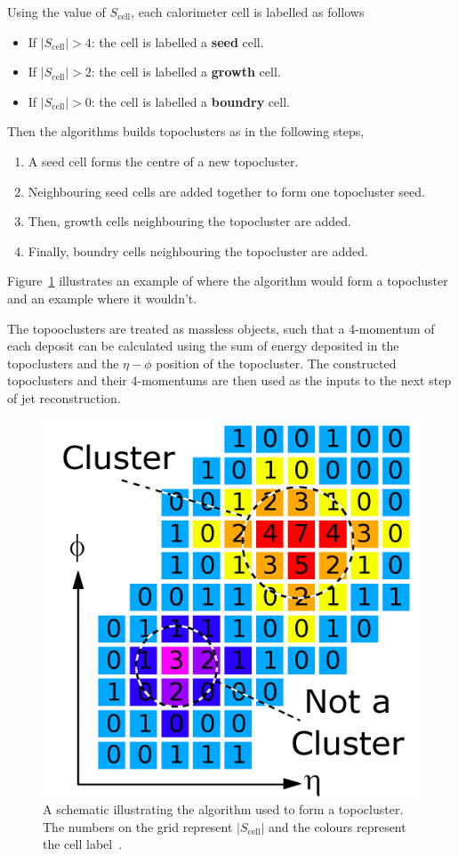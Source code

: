 \noindent
Using the value of $S_{\text{cell}}$, each calorimeter cell is labelled as follows
\begin{itemize}
\item If $|S_{\text{cell}}| > 4$: the cell is labelled a \textbf{seed} cell.
\item If $|S_{\text{cell}}| > 2$: the cell is labelled a \textbf{growth} cell.
\item If $|S_{\text{cell}}| > 0$: the cell is labelled a \textbf{boundry} cell.
\end{itemize}
Then the algorithms builds topoclusters as in the following steps,
\begin{enumerate}
\item A seed cell forms the centre of a new topocluster.
\item Neighbouring seed cells are added together to form one topocluster seed.
\item Then, growth cells neighbouring the topocluster are added.
\item Finally, boundry cells neighbouring the topocluster are added.
\end{enumerate}
Figure~\ref{fig:obj-topo_schem} illustrates an example of where the algorithm would form a topocluster and an example where it wouldn't.

The topooclusters are treated as massless objects,
such that a 4-momentum of each deposit can be calculated using the sum of energy deposited in the topoclusters
and the $\eta-\phi$ position of the topocluster.
The constructed topoclusters and their 4-momentums are then used as the inputs to the next step of jet reconstruction.

\begin{figure}[!hbt]
  \begin{center}
    \includegraphics[width=0.45\linewidth, angle=0]{figs/Objects/topo_schem.png}
  \end{center}
  \caption[A schematic illustrating the algorithm used to form a topocluster. The numbers on the grid represent $|S_{\text{cell}}|$ and the colours represent the cell label.]
          {A schematic illustrating the algorithm used to form a topocluster. The numbers on the grid represent $|S_{\text{cell}}|$ and the colours represent the cell label~\cite{det-magnet_fig}.}
  \label{fig:obj-topo_schem}
\end{figure}

